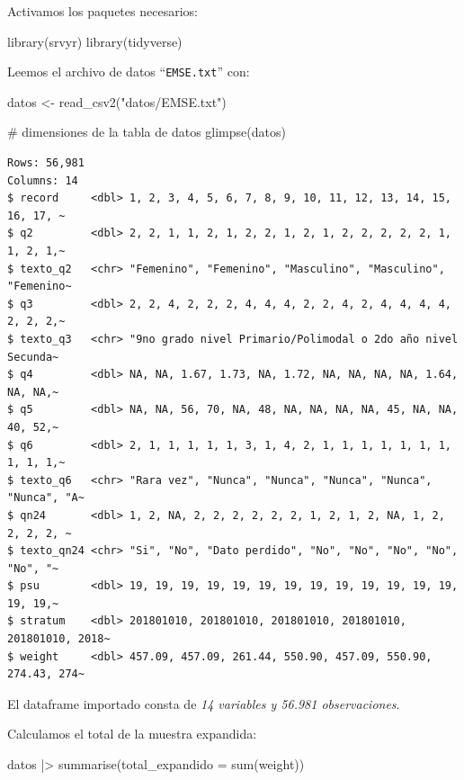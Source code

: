 \documentclass[
  spanish,
  a4paper,
]{scrbook}
\newenvironment{Shaded}{\begin{snugshade}}{\end{snugshade}}
\newcommand{\AttributeTok}[1]{\textcolor[rgb]{0.40,0.45,0.13}{#1}}
\newcommand{\CommentTok}[1]{\textcolor[rgb]{0.37,0.37,0.37}{#1}}
\newcommand{\FunctionTok}[1]{\textcolor[rgb]{0.28,0.35,0.67}{#1}}
\newcommand{\NormalTok}[1]{\textcolor[rgb]{0.00,0.23,0.31}{#1}}
\newcommand{\OtherTok}[1]{\textcolor[rgb]{0.00,0.23,0.31}{#1}}
\newcommand{\SpecialCharTok}[1]{\textcolor[rgb]{0.37,0.37,0.37}{#1}}
\newcommand{\StringTok}[1]{\textcolor[rgb]{0.13,0.47,0.30}{#1}}
\begin{document}
Activamos los paquetes necesarios:

\begin{Shaded}
\begin{Highlighting}[]
\FunctionTok{library}\NormalTok{(srvyr)}
\FunctionTok{library}\NormalTok{(tidyverse)}
\end{Highlighting}
\end{Shaded}

Leemos el archivo de datos ``\texttt{EMSE.txt}'' con:

\begin{Shaded}
\begin{Highlighting}[]
\NormalTok{datos }\OtherTok{\textless{}{-}} \FunctionTok{read\_csv2}\NormalTok{(}\StringTok{"datos/EMSE.txt"}\NormalTok{)}

\CommentTok{\# dimensiones de la tabla de datos}
\FunctionTok{glimpse}\NormalTok{(datos)}
\end{Highlighting}
\end{Shaded}

\begin{verbatim}
Rows: 56,981
Columns: 14
$ record     <dbl> 1, 2, 3, 4, 5, 6, 7, 8, 9, 10, 11, 12, 13, 14, 15, 16, 17, ~
$ q2         <dbl> 2, 2, 1, 1, 2, 1, 2, 2, 1, 2, 1, 2, 2, 2, 2, 2, 1, 1, 2, 1,~
$ texto_q2   <chr> "Femenino", "Femenino", "Masculino", "Masculino", "Femenino~
$ q3         <dbl> 2, 2, 4, 2, 2, 2, 4, 4, 4, 2, 2, 4, 2, 4, 4, 4, 4, 2, 2, 2,~
$ texto_q3   <chr> "9no grado nivel Primario/Polimodal o 2do año nivel Secunda~
$ q4         <dbl> NA, NA, 1.67, 1.73, NA, 1.72, NA, NA, NA, NA, 1.64, NA, NA,~
$ q5         <dbl> NA, NA, 56, 70, NA, 48, NA, NA, NA, NA, 45, NA, NA, 40, 52,~
$ q6         <dbl> 2, 1, 1, 1, 1, 1, 3, 1, 4, 2, 1, 1, 1, 1, 1, 1, 1, 1, 1, 1,~
$ texto_q6   <chr> "Rara vez", "Nunca", "Nunca", "Nunca", "Nunca", "Nunca", "A~
$ qn24       <dbl> 1, 2, NA, 2, 2, 2, 2, 2, 2, 1, 2, 1, 2, NA, 1, 2, 2, 2, 2, ~
$ texto_qn24 <chr> "Si", "No", "Dato perdido", "No", "No", "No", "No", "No", "~
$ psu        <dbl> 19, 19, 19, 19, 19, 19, 19, 19, 19, 19, 19, 19, 19, 19, 19,~
$ stratum    <dbl> 201801010, 201801010, 201801010, 201801010, 201801010, 2018~
$ weight     <dbl> 457.09, 457.09, 261.44, 550.90, 457.09, 550.90, 274.43, 274~
\end{verbatim}

El dataframe importado consta de \emph{14 variables y 56.981
observaciones}.

Calculamos el total de la muestra expandida:

\begin{Shaded}
\begin{Highlighting}[]
\NormalTok{datos }\SpecialCharTok{|\textgreater{}}
  \FunctionTok{summarise}\NormalTok{(}\AttributeTok{total\_expandido =} \FunctionTok{sum}\NormalTok{(weight))}
\end{Highlighting}
\end{Shaded}
\end{document}
